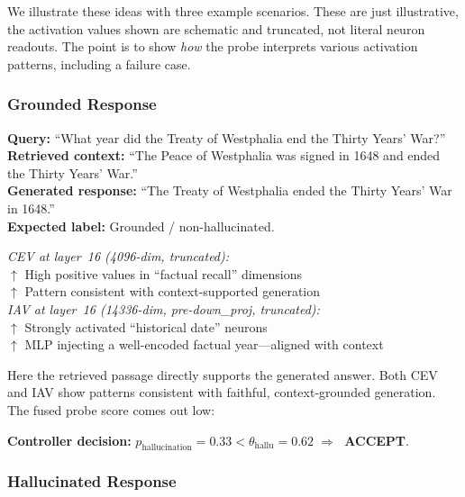 We illustrate these ideas with three example scenarios. These are just illustrative, the activation values shown are schematic and truncated, not literal neuron readouts. The point is to show \emph{how} the probe interprets various activation patterns, including a failure case.

\subsubsection{Grounded Response}

\begin{groundedbox}
\textbf{Query:} ``What year did the Treaty of Westphalia end the Thirty Years' War?''\\[4pt]
\textbf{Retrieved context:} ``The Peace of Westphalia was signed in 1648 and ended the Thirty Years' War.''\\[4pt]
\textbf{Generated response:} ``The Treaty of Westphalia ended the Thirty Years' War in 1648.''\\[4pt]
\textbf{Expected label:} Grounded / non-hallucinated.
\end{groundedbox}

\begin{activationbox}
\textit{CEV at layer~16 (4096-dim, truncated):}\\
$\uparrow$ High positive values in ``factual recall'' dimensions\\
$\uparrow$ Pattern consistent with context-supported generation\\[6pt]
\textit{IAV at layer~16 (14336-dim, pre-down\_proj, truncated):}\\
$\uparrow$ Strongly activated ``historical date'' neurons\\
$\uparrow$ MLP injecting a well-encoded factual year---aligned with context
\end{activationbox}

\vspace{0.4em}
\noindent Here the retrieved passage directly supports the generated answer. Both CEV and IAV show patterns consistent with faithful, context-grounded generation. The fused probe score comes out low:

\noindent\textbf{Controller decision:} $p_{\text{hallucination}} = 0.33 < \theta_{\text{hallu}} = 0.62 \;\Rightarrow\;$ \textcolor{acceptgreen}{\textbf{ACCEPT}}.

\subsubsection{Hallucinated Response}

